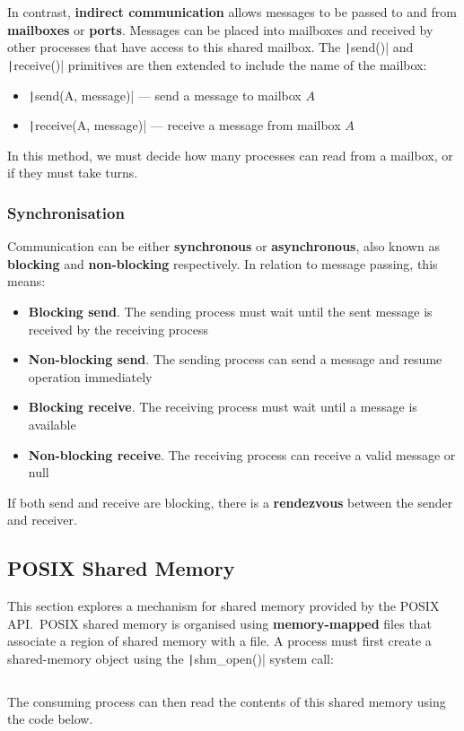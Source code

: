 \documentclass{article}
\begin{document}
In contrast, \textbf{indirect communication} allows messages to be
passed to and from \textbf{mailboxes} or \textbf{ports}. Messages can
be placed into mailboxes and received by other processes that have
access to this shared mailbox. The \texttt|send()| and
\texttt|receive()| primitives are then extended to include
the name of the mailbox:
\begin{itemize}
    \item \texttt|send(A, message)| --- send a message to
          mailbox \(A\)
    \item \texttt|receive(A, message)| --- receive a message
          from mailbox \(A\)
\end{itemize}
In this method, we must decide how many processes can read from a
mailbox, or if they must take turns.
\subsubsection{Synchronisation}
Communication can be either \textbf{synchronous} or
\textbf{asynchronous}, also known as \textbf{blocking} and
\textbf{non-blocking} respectively. In relation to message passing,
this means:
\begin{itemize}
    \item \textbf{Blocking send}. The sending process must wait until
          the sent message is received by the receiving process
    \item \textbf{Non-blocking send}. The sending process can send a
          message and resume operation immediately
    \item \textbf{Blocking receive}. The receiving process must wait
          until a message is available
    \item \textbf{Non-blocking receive}. The receiving process can
          receive a valid message or null
\end{itemize}
If both send and receive are blocking, there is a \textbf{rendezvous}
between the sender and receiver.
\subsection{POSIX Shared Memory}
This section explores a mechanism for shared memory provided by the
POSIX API.\ POSIX shared memory is organised using
\textbf{memory-mapped} files that associate a region of shared memory
with a file. A process must first create a shared-memory object using
the \texttt|shm_open()| system call:
\inputminted{c}{code/posix_shared_memory_producer.c} The consuming
process can then read the contents of this shared memory using the code
below. \inputminted{c}{code/posix_shared_memory_consumer.c}
\end{document}
